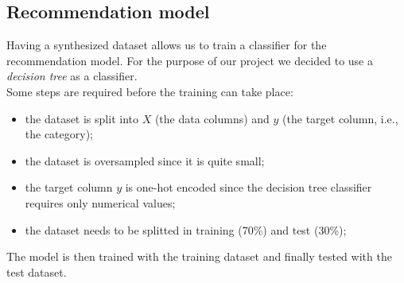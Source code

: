 \documentclass[../../main]{subfiles}
\begin{document}
\subsection{Recommendation model}
\label{ss:recommendation-model}

Having a synthesized dataset allows us to train a classifier for the recommendation model.
For the purpose of our project we decided to use a \textit{decision tree} as a classifier.\\
Some steps are required before the training can take place:
\begin{itemize}
    \item the dataset is split into $X$ (the data columns) and $y$ (the target column, i.e., the category);
    \item the dataset is oversampled since it is quite small;
    \item the target column $y$ is one-hot encoded since the decision tree classifier requires only numerical values;
    \item the dataset needs to be splitted in training (70\%) and test (30\%);
\end{itemize}
The model is then trained with the training dataset and finally tested with the test dataset.
\end{document}
